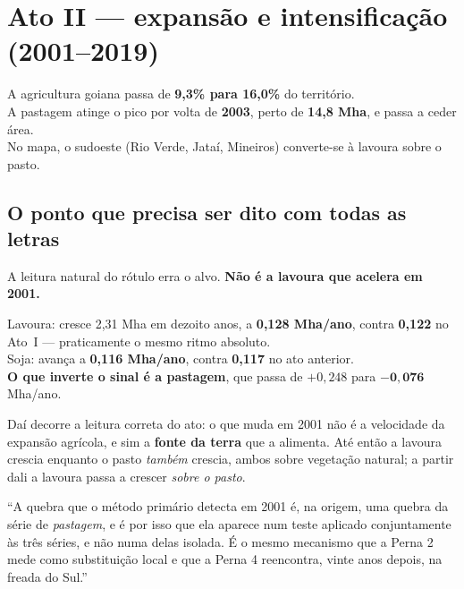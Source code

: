 \section{Ato II --- expansão e intensificação (2001--2019)}

\begin{ancora}
A agricultura goiana passa de \textbf{9,3\% para 16,0\%} do território. \\
A pastagem atinge o pico por volta de \textbf{2003}, perto de \textbf{14,8 Mha},
e passa a ceder área. \\
No mapa, o sudoeste (Rio Verde, Jataí, Mineiros) converte-se à lavoura sobre o
pasto.
\end{ancora}

\subsection{O ponto que precisa ser dito com todas as letras}

A leitura natural do rótulo erra o alvo. \textbf{Não é a lavoura que acelera em
2001.}

\begin{ancora}
Lavoura: cresce 2,31 Mha em dezoito anos, a \textbf{0,128 Mha/ano}, contra
\textbf{0,122} no Ato~I --- praticamente o mesmo ritmo absoluto. \\
Soja: avança a \textbf{0,116 Mha/ano}, contra \textbf{0,117} no ato anterior. \\
\textbf{O que inverte o sinal é a pastagem}, que passa de $+0{,}248$ para
$\mathbf{-0{,}076}$ Mha/ano.
\end{ancora}

Daí decorre a leitura correta do ato: o que muda em 2001 não é a velocidade da
expansão agrícola, e sim a \textbf{fonte da terra} que a alimenta. Até então a
lavoura crescia enquanto o pasto \emph{também} crescia, ambos sobre vegetação
natural; a partir dali a lavoura passa a crescer \emph{sobre o pasto}.

\begin{nabanca}
``A quebra que o método primário detecta em 2001 é, na origem, uma quebra da
série de \emph{pastagem}, e é por isso que ela aparece num teste aplicado
conjuntamente às três séries, e não numa delas isolada. É o mesmo mecanismo que
a Perna 2 mede como substituição local e que a Perna 4 reencontra, vinte anos
depois, na freada do Sul.''
\end{nabanca}

